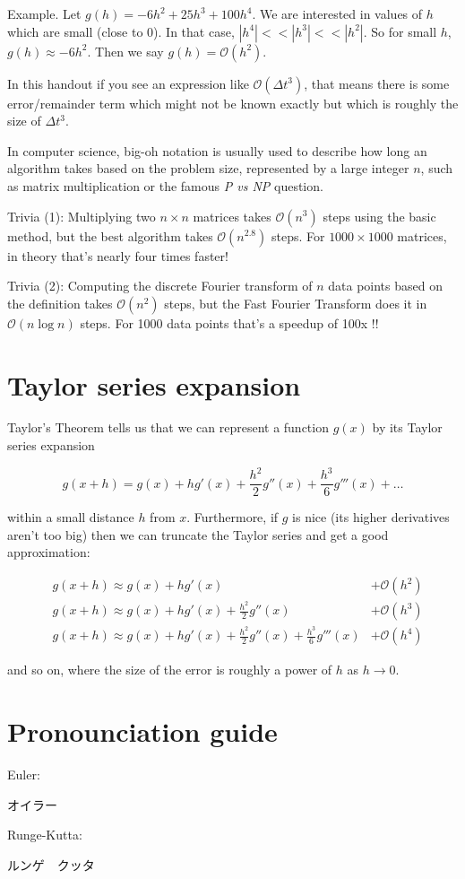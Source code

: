 \documentclass{article}
\newcommand{\dt}{\Delta t}
\newcommand{\bigO}{\mathcal{O}}
\begin{document}
Example. Let $g(h) = -6h^2 + 25 h^3 + 100 h^4$.
We are interested in values of $h$ which are small (close to 0). In that case, $|h^4| << |h^3| << |h^2|$.
So for small $h$, $g(h) \approx -6h^2.$ Then we say $g(h) = \bigO(h^2)$.

In this handout if you see an expression like $\bigO(\dt^3)$, that means there is some
error/remainder term which might not be known exactly but which is roughly the size of $\dt^3$.

In computer science, big-oh notation is usually used to describe
how long an algorithm takes based on the problem size, represented by a large integer $n$,
such as matrix multiplication or the famous \emph{P vs NP} question.

Trivia (1): Multiplying two $n\times n$ matrices takes $\bigO(n^3)$ steps using the basic method,
but the best algorithm takes $\bigO(n^{2.8})$ steps.
For $1000\times 1000$ matrices, in theory that's nearly four times faster!

Trivia (2): Computing the discrete Fourier transform of $n$ data points
based on the definition takes $\bigO(n^2)$ steps,
but the Fast Fourier Transform does it in $\bigO(n \log n)$ steps.
For 1000 data points that's a speedup of 100x !!

\section{Taylor series expansion}
\label{a:taylor}
Taylor's Theorem tells us that we can represent a function $g(x)$
by its Taylor series expansion

\begin{equation}
    g(x+h) = g(x) + h g'(x) + \frac{h^2}{2} g''(x) + \frac{h^3}{6} g'''(x) + \ldots
\end{equation}

within a small distance $h$ from $x$.
Furthermore, if $g$ is nice (its higher derivatives aren't too big) then we can truncate the Taylor series
and get a good approximation:

\begin{align*}
    &g(x+h) \approx g(x) + h g'(x) &+ \bigO(h^2) \\
    &g(x+h) \approx g(x) + h g'(x) + \frac{h^2}{2} g''(x) &+ \bigO(h^3) \\
    &g(x+h) \approx g(x) + h g'(x) + \frac{h^2}{2} g''(x) + \frac{h^3}{6} g'''(x) &+ \bigO(h^4)
\end{align*}

and so on, where the size of the error is roughly a power of $h$ as $h\rightarrow 0$.

\section{Pronounciation guide}

Euler: \begin{CJK}{UTF8}{min}オイラー\end{CJK}

Runge-Kutta: \begin{CJK}{UTF8}{min}ルンゲ　クッタ\end{CJK}
\end{document}
